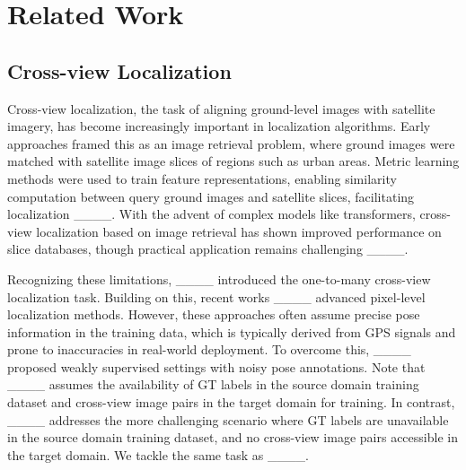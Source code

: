 \section{Related Work}
\subsection{Cross-view Localization}
Cross-view localization, the task of aligning ground-level images with satellite imagery, has become increasingly important in localization algorithms. Early approaches framed this as an image retrieval problem, where ground images were matched with satellite image slices of regions such as urban areas. Metric learning methods were used to train feature representations, enabling similarity computation between query ground images and satellite slices, facilitating localization ____. With the advent of complex models like transformers, cross-view localization based on image retrieval has shown improved performance on slice databases, though practical application remains challenging ____.

Recognizing these limitations, ____ introduced the one-to-many cross-view localization task. Building on this, recent works ____ advanced pixel-level localization methods. However, these approaches often assume precise pose information in the training data, which is typically derived from GPS signals and prone to inaccuracies in real-world deployment. To overcome this, ____ proposed weakly supervised settings with noisy pose annotations. 
Note that ____ assumes the availability of GT labels in the source domain training dataset and cross-view image pairs in the target domain for training. In contrast, ____ addresses the more challenging scenario where GT labels are unavailable in the source domain training dataset, and no cross-view image pairs accessible in the target domain. We tackle the same task as ____.



